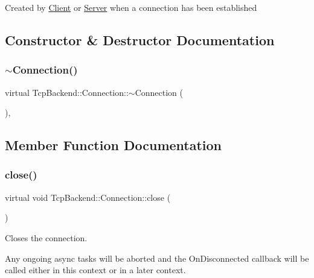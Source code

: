 Created by \hyperlink{classTcpBackend_1_1Client}{Client} or \hyperlink{classTcpBackend_1_1Server}{Server} when a connection has been established 

\subsection{Constructor \& Destructor Documentation}
\mbox{\label{classTcpBackend_1_1Connection_af9b388c0d9a4af734257da80bde24e30}} 
\subsubsection{\texorpdfstring{$\sim$\+Connection()}{~Connection()}}
{\footnotesize\ttfamily virtual Tcp\+Backend\+::\+Connection\+::$\sim$\+Connection (\begin{DoxyParamCaption}{ }\end{DoxyParamCaption})\hspace{0.3cm}{\ttfamily [virtual]}, {\ttfamily [default]}}



\subsection{Member Function Documentation}
\mbox{\label{classTcpBackend_1_1Connection_aa3cbc715deb54c286149457c7819f514}} 
\subsubsection{\texorpdfstring{close()}{close()}}
{\footnotesize\ttfamily virtual void Tcp\+Backend\+::\+Connection\+::close (\begin{DoxyParamCaption}{ }\end{DoxyParamCaption})\hspace{0.3cm}{\ttfamily [pure virtual]}}



Closes the connection. 

Any ongoing async tasks will be aborted and the On\+Disconnected callback will be called either in this context or in a later context.

